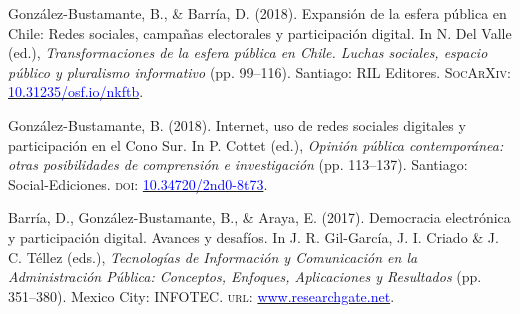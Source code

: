 \begin{publications}
\begin{benumerate}{12}
\item{\small González-Bustamante, B., \& Barría, D. (2018). Expansión de la esfera pública en Chile: Redes sociales, campañas electorales y participación digital. In N. Del Valle (ed.), {\itshape Transformaciones de la esfera pública en Chile. Luchas sociales, espacio público y pluralismo informativo} (pp. 99--116). Santiago: RIL Editores. {\scshape \footnotesize SocArXiv:} \href{https://doi.org/10.31235/osf.io/nkftb}{\textcolor{blue}{10.31235/osf.io/nkftb}}.}\vspace{1mm}


\item{\small González-Bustamante, B. (2018). Internet, uso de redes sociales digitales y participación en el Cono Sur. In P. Cottet (ed.), {\itshape Opinión pública contemporánea: otras posibilidades de comprensión e investigación} (pp. 113--137). Santiago: Social-Ediciones. {\scshape doi:} \href{https://doi.org/10.34720/2nd0-8t73}{\textcolor{blue}{10.34720/2nd0-8t73}}.}\vspace{1mm}


\item{\small Barría, D., González-Bustamante, B., \& Araya, E. (2017). Democracia electrónica y participación digital. Avances y desafíos. In J. R. Gil-García, J. I. Criado \&  J. C. Téllez (eds.), {\itshape Tecnologías de Información y Comunicación en la Administración P\'ublica: Conceptos, Enfoques, Aplicaciones y Resultados} (pp. 351--380). Mexico City: INFOTEC. {\scshape url:} \href{https://www.researchgate.net/publication/321980289_Democracia_electronica_y_participacion_digital_Avances_y_desafios}{\textcolor{blue}{www.researchgate.net}}.}\vspace{1mm}


\end{benumerate}
\end{publications}
